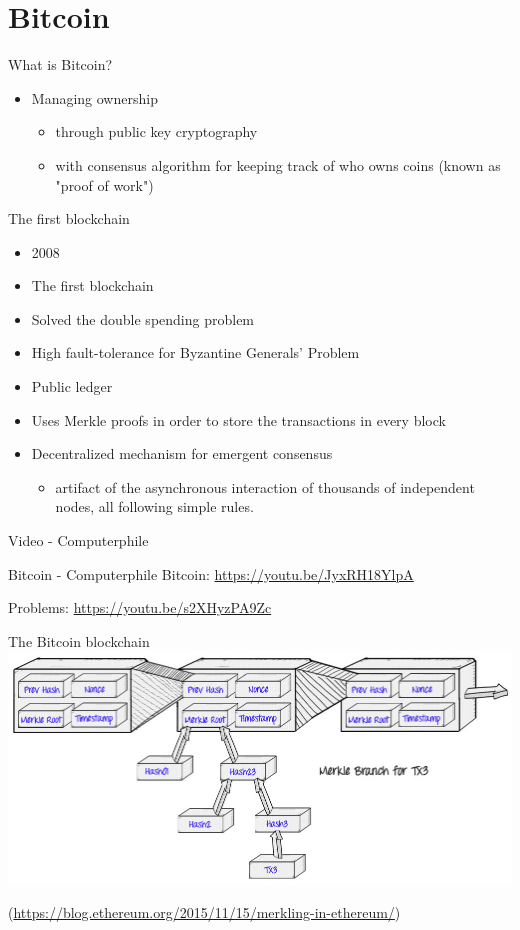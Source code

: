 \documentclass[presentation]{beamer}
\begin{document}
\section{Bitcoin}
\label{sec-3}
\begin{frame}[label=sec-3-1]{What is Bitcoin?}
\begin{itemize}
\item Managing ownership
\begin{itemize}
\item through \alert{public key cryptography}
\item with \alert{consensus algorithm} for keeping track of who owns coins (known as "\alert{proof of work}")
\end{itemize}
\end{itemize}
\end{frame}

\begin{frame}[label=sec-3-2]{The first blockchain}
\begin{itemize}
\item 2008
\item The first blockchain
\item Solved the \alert{double spending problem}
\item High fault-tolerance for \alert{Byzantine Generals' Problem}
\item \alert{Public ledger}
\item Uses \alert{Merkle proofs} in order to store the transactions in every block
\item Decentralized mechanism for \alert{emergent consensus}
\begin{itemize}
\item artifact of the asynchronous interaction of thousands of independent nodes, all following simple rules.
\end{itemize}
\end{itemize}
\end{frame}
\begin{frame}[label=sec-3-3]{Video - Computerphile}
\begin{alertblock}{Bitcoin - Computerphile}
Bitcoin: \url{https://youtu.be/JyxRH18YlpA}

Problems: \url{https://youtu.be/s2XHyzPA9Zc}
\end{alertblock}
\end{frame}
\begin{frame}[label=sec-3-4]{The Bitcoin blockchain}
\includegraphics[width=.9\linewidth]{../images/mining.jpeg}

(\url{https://blog.ethereum.org/2015/11/15/merkling-in-ethereum/})
\end{frame}
\end{document}
